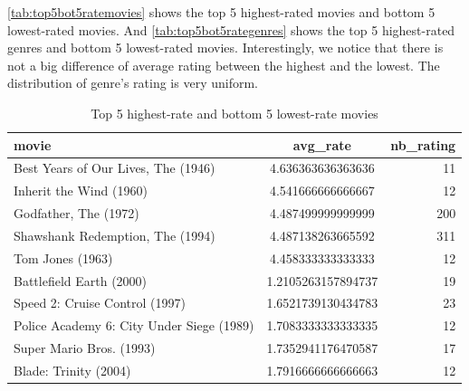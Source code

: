 \documentclass{article}
\begin{document}
\begin{itemize}
    \autoref{tab:top5bot5ratemovies} shows the top 5 highest-rated movies and bottom 5 lowest-rated movies. And \autoref{tab:top5bot5rategenres} shows the top 5 highest-rated genres and bottom 5 lowest-rated movies. Interestingly, we notice that there is not a big difference of average rating between the highest and the lowest. The distribution of genre's rating is very uniform.  

    \begin{table}[!ht]
    \centering
    \caption{Top 5 highest-rate and bottom 5 lowest-rate movies}
    \label{tab:top5bot5ratemovies}
    \begin{tabular}{@{}lS[table-auto-round]r@{}}
    \hline
        {movie} & {avg\_rate} & {nb\_rating} \\ 
        \hline
        Best Years of Our Lives, The (1946) & 4.636363636363636 & 11 \\ 
        Inherit the Wind (1960) & 4.541666666666667 & 12 \\ 
        Godfather, The (1972) & 4.487499999999999 & 200 \\ 
        Shawshank Redemption, The (1994) & 4.487138263665592 & 311 \\ 
        Tom Jones (1963) & 4.458333333333333 & 12 \\ \hline
        Battlefield Earth (2000) & 1.2105263157894737 & 19 \\ 
        Speed 2: Cruise Control (1997) & 1.6521739130434783 & 23 \\ 
        Police Academy 6: City Under Siege (1989) & 1.7083333333333335 & 12 \\ 
        Super Mario Bros. (1993) & 1.7352941176470587 & 17 \\ 
        Blade: Trinity (2004) & 1.7916666666666663 & 12 \\ \hline
    \end{tabular}
    \end{table}


\end{itemize}
\end{document}
